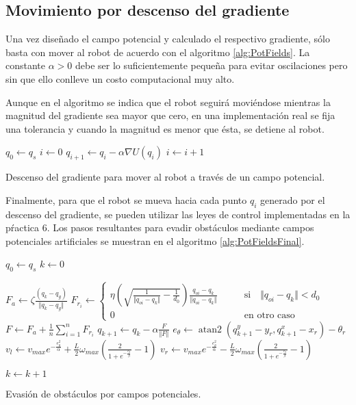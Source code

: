 \documentclass[letterpaper,12pt]{article}
\newcommand\ddfrac[2]{\frac{\displaystyle #1}{\displaystyle #2}}
\DeclareMathOperator{\atantwo}{atan2}
\begin{document}
\subsection{Movimiento por descenso del gradiente}
Una vez diseñado el campo potencial y calculado el respectivo gradiente, sólo basta con mover al robot de acuerdo con el algoritmo \ref{alg:PotFields}. La constante $\alpha > 0$ debe ser lo suficientemente pequeña para evitar oscilaciones pero sin que ello conlleve un costo computacional muy alto. 

Aunque en el algoritmo se indica que el robot seguirá moviéndose mientras la magnitud del gradiente sea mayor que cero, en una implementación real se fija una tolerancia y cuando la magnitud es menor que ésta, se detiene al robot. 
\begin{algorithm}
\DontPrintSemicolon
{}
$q_0 \leftarrow q_s$\;
$i \leftarrow 0$\;
{
  $q_{i+1} \leftarrow q_i - \alpha\nabla U(q_i)$\;
  $i \leftarrow i + 1$
}
  \caption{Descenso del gradiente para mover al robot a través de un campo potencial.}
  \label{alg:PotFields}
\end{algorithm}

Finalmente, para que el robot se mueva hacia cada punto $q_i$ generado por el descenso del gradiente, se pueden utilizar las leyes de control implementadas en la pŕactica 6. Los pasos resultantes para evadir obstáculos mediante campos potenciales artificiales se muestran en el algoritmo \ref{alg:PotFieldsFinal}.

\begin{algorithm}
\DontPrintSemicolon
{}
$q_0 \leftarrow q_s$\;
$k \leftarrow 0$\;
{
  $F_a \leftarrow \zeta \ddfrac{\left(q_k - q_g\right) }{\Vert q_k - q_g \Vert}$\;
  {
  $F_{r_i} \leftarrow \begin{cases}
    \eta\left(\sqrt{\frac{1}{\Vert q_{oi} - q_k\Vert} - \frac{1}{d_0}}\right)\ddfrac{q_{oi} - q_k}{\Vert q_{oi} - q_k\Vert}
    & \qquad\textrm{si}\quad \Vert q_{oi} - q_k\Vert < d_0\\
    0 & \qquad\textrm{en otro caso}
    \end{cases}$\;
  }
  $F \leftarrow F_a + \frac{1}{n}\sum_{i=1}^n F_{r_i}$\;
  $q_{k+1} \leftarrow q_k - \alpha \ddfrac{F}{\Vert F \Vert}$\;
  $e_{\theta} \leftarrow \atantwo\left(q_{k+1}^y - y_r, q_{k+1}^x - x_r\right) - \theta_r$\;
  $v_{l} \leftarrow v_{max}e^{-\frac{e_{\theta}^{2}}{\alpha}} + 
  \frac{L}{2}\omega_{max}\left(\frac{2}{1+e^{-\frac{e_{\theta}}{\beta}}}-1\right)$\;
  $v_{r} \leftarrow v_{max}e^{-\frac{e_{\theta}^{2}}{\alpha}} -
  \frac{L}{2}\omega_{max}\left(\frac{2}{1+e^{-\frac{e_{\theta}}{\beta}}}-1\right)$\;

  $k \leftarrow k + 1$
}
  \caption{Evasión de obstáculos por campos potenciales.}
  \label{alg:PotFieldsFinal}
\end{algorithm}
\end{document}
